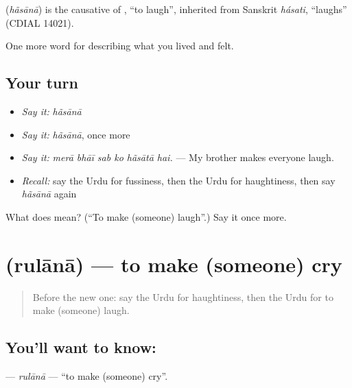\begin{cousinweb}
\textbf{} (\emph{hãsānā}) is the causative of \textbf{}, \textquotedblleft{}to laugh\textquotedblright{}, inherited from Sanskrit \emph{hásati}, \textquotedblleft{}laughs\textquotedblright{} (CDIAL 14021).
\end{cousinweb}

\begin{grammarlens}[title={What you've built}]
One more word for describing what you lived and felt.
\end{grammarlens}

\subsection*{Your turn}
\begin{itemize}
\raggedright
  \item \emph{Say it:} \emph{hãsānā}
  \item \emph{Say it:} \emph{hãsānā}, once more
  \item \emph{Say it:} \emph{merā bhāī sab ko hãsātā hai.} — My brother makes everyone laugh.
  \item \emph{Recall:} say the Urdu for fussiness, then the Urdu for haughtiness, then say \emph{hãsānā} again
\end{itemize}

\begin{tcolorbox}[breakable,colback=teal!4,colframe=teal!35!black,title={Before you move on}]
What does  mean? (\textquotedblleft{}To make (someone) laugh\textquotedblright{}.) Say it once more.
\end{tcolorbox}
\section[\texorpdfstring{\ur{رلانا} (rulānā)}{رلانا (rulānā)}]{ (rulānā) — to make (someone) cry}

\label{lesson:UR-C453-rulana}



\begin{quote}
Before the new one: say the Urdu for haughtiness, then the Urdu for to make (someone) laugh.
\end{quote}

\subsection*{You'll want to know: }
\textbf{} — \emph{rulānā} — \textquotedblleft{}to make (someone) cry\textquotedblright{}.

